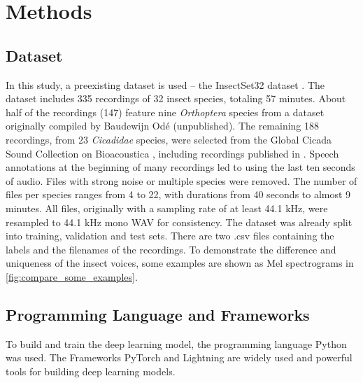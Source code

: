 

\section{Methods}
\label{methods}

\subsection{Dataset}%

In this study, a preexisting dataset is used -- the InsectSet32 dataset \autocite{faissInsectSet32DatasetAutomatic2022}. 
The dataset includes 335 recordings of 32 insect species, totaling 57 minutes.
About half of the recordings (147) feature nine \textit{Orthoptera} species from a dataset originally compiled by Baudewijn Odé (unpublished). 
The remaining 188 recordings, from 23 \textit{Cicadidae} species, were selected from the Global Cicada Sound 
Collection on Bioacoustica \autocite{bakerBioAcousticaFreeOpen2015}, including recordings 
published in \autocites{bakerGlobalCicadaSound2015}{poppleRevisionMyopsaltaCrucifera2017}. 
Speech annotations at the beginning of many recordings led to using the last ten seconds of audio. 
Files with strong noise or multiple species were removed. The number of files per species ranges from 4 to 22, 
with durations from 40 seconds to almost 9 minutes. All files, originally with a sampling rate of at least 44.1 kHz, 
were resampled to 44.1 kHz mono WAV for consistency.
The dataset was already split into training, validation and test sets. There are two .csv files containing
the labels and the filenames of the recordings. To demonstrate the difference and uniqueness of the insect voices, some examples are shown 
as Mel spectrograms in \autoref{fig:compare_some_examples}.



\subsection{Programming Language and Frameworks}%
To build and train the deep learning model, the programming language Python was used.
The Frameworks PyTorch and Lightning are widely used and powerful tools for building deep learning models.

